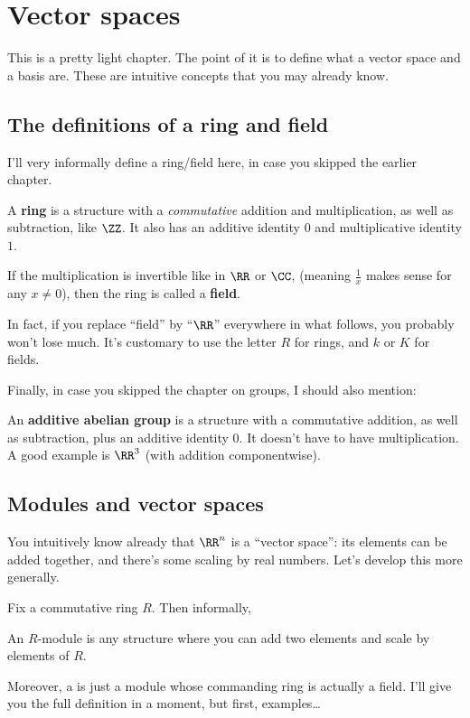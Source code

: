 \chapter{Vector spaces}
This is a pretty light chapter.
The point of it is to define what a vector space and a basis are.
These are intuitive concepts that you may already know.

\section{The definitions of a ring and field}

I'll very informally define a ring/field here,
in case you skipped the earlier chapter.
\begin{itemize}
	\ii A \textbf{ring} is a structure with a \emph{commutative}
	addition and multiplication, as well as subtraction, like $\ZZ$.
	It also has an additive identity $0$ and multiplicative identity $1$.

	\ii If the multiplication is invertible like in $\RR$ or $\CC$,
	(meaning $\frac 1x$ makes sense for any $x \neq 0$),
	then the ring is called a \textbf{field}.
\end{itemize}
In fact, if you replace ``field'' by ``$\RR$'' everywhere in what follows,
you probably won't lose much.
It's customary to use the letter $R$ for rings, and $k$ or $K$ for fields.

Finally, in case you skipped the chapter on groups, I should also mention:
\begin{itemize}
	\ii An \textbf{additive abelian group} is a structure
	with a commutative addition, as well as subtraction,
	plus an additive identity $0$.
	It doesn't have to have multiplication.
	A good example is $\RR^3$ (with addition componentwise).
\end{itemize}

\section{Modules and vector spaces}
You intuitively know already that $\RR^n$ is a ``vector space'':
its elements can be added together,
and there's some scaling by real numbers.
Let's develop this more generally.

Fix a commutative ring $R$.
Then informally,
\begin{moral}
	An $R$-module is any structure where you can add two elements
	and scale by elements of $R$.
\end{moral}
Moreover, a  is just a module whose commanding ring
is actually a field.
I'll give you the full definition in a moment,
but first, examples\dots

